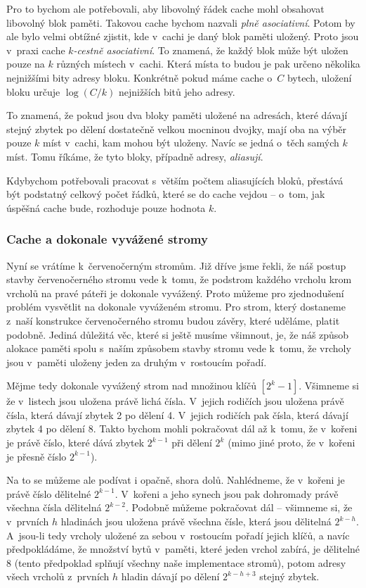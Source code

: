 Pro to bychom ale potřebovali, aby libovolný řádek cache mohl obsahovat
libovolný blok paměti. Takovou cache bychom nazvali \emph{plně asociativní}.
Potom by ale bylo velmi obtížné zjistit, kde v~cachi je daný blok paměti
uložený. Proto jsou v~praxi cache \emph{$k$-cestně asociativní}. To znamená, že
každý blok může být uložen pouze na $k$ různých místech v~cachi. Která místa to
budou je pak určeno několika nejnižšími bity adresy bloku. Konkrétně pokud máme
cache o~$C$ bytech, uložení bloku určuje $\log (C/k)$ nejnižších bitů jeho
adresy.

To znamená, že pokud jsou dva bloky paměti uložené na adresách, které dávají
stejný zbytek po dělení dostatečně velkou mocninou dvojky, mají oba na výběr
pouze $k$ míst v~cachi, kam mohou být uloženy. Navíc se jedná o~těch samých $k$
míst. Tomu říkáme, že tyto bloky, případně adresy, \emph{aliasují}.

Kdybychom potřebovali pracovat s~větším počtem aliasujících bloků, přestává být
podstatný celkový počet řádků, které se do cache vejdou -- o~tom, jak úspěšná
cache bude, rozhoduje pouze hodnota $k$.

\subsubsection{Cache a dokonale vyvážené stromy}\label{sec:cache_and_balanced}

Nyní se vrátíme k~červenočerným stromům. Již dříve jsme řekli, že náš postup stavby červenočerného stromu vede k~tomu, že podstrom každého vrcholu krom vrcholů na pravé páteři je dokonale vyvážený. Proto můžeme pro zjednodušení problém vysvětlit na dokonale vyváženém stromu. Pro strom, který dostaneme z~naší konstrukce červenočerného stromu budou závěry, které uděláme, platit podobně. Jediná důležitá věc, které si ještě musíme všimnout, je, že náš způsob alokace paměti spolu s~naším způsobem stavby stromu vede k~tomu, že vrcholy jsou v~paměti uloženy jeden za druhým v~rostoucím pořadí.

Mějme tedy dokonale vyvážený strom nad množinou klíčů $[2^k-1]$. Všimneme si že v~listech jsou uložena právě lichá čísla. V~jejich rodičích jsou uložena právě čísla, která dávají zbytek 2 po dělení 4. V~jejich rodičích pak čísla, která dávají zbytek 4 po dělení 8. Takto bychom mohli pokračovat dál až k~tomu, že v~kořeni je právě číslo, které dává zbytek $2^{k-1}$ při dělení $2^k$ (mimo jiné proto, že v~kořeni je přesně číslo $2^{k-1}$).

Na to se můžeme ale podívat i opačně, shora dolů. Nahlédneme, že v~kořeni je právě číslo dělitelné $2^{k-1}$. V~kořeni a jeho synech jsou pak dohromady právě všechna čísla dělitelná $2^{k-2}$. Podobně můžeme pokračovat dál -- všimneme si, že v~prvních $h$ hladinách jsou uložena právě všechna čísle, která jsou dělitelná $2^{k-h}$. A~jsou-li tedy vrcholy uložené za sebou v~rostoucím pořadí jejich klíčů, a navíc předpokládáme, že množství bytů v~paměti, které jeden vrchol zabírá, je dělitelné 8 (tento předpoklad splňují všechny naše implementace stromů), potom adresy všech vrcholů z~prvních $h$ hladin dávají po dělení $2^{k-h+3}$ stejný zbytek.

